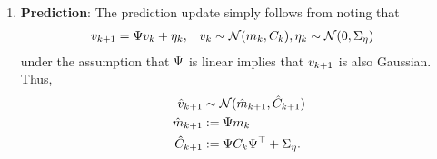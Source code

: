 \documentclass[12pt]{article}
\begin{document}
\begin{enumerate}
\item \textbf{Prediction}: The prediction update simply follows from noting that 
\begin{align*}
\dstate[\timeStep+1] &= \fwdOne \dstate + \indexTimeStep{\noiseDynamic}, 
&&\dstate \sim \Gaussian(\stateMean, \stateCov), \indexTimeStep{\noiseDynamic} \sim \Gaussian(0, \CovNoiseDynamic)
\end{align*}
under the assumption that $\fwdOne$ is linear implies that $\dstate[\timeStep+1]$ is also Gaussian. Thus, 
\begin{align*}
\dstatePred[\timeStep+1] &\sim \Gaussian(\stateMeanPred[\timeStep+1], \stateCovPred[\timeStep+1]) \\
\stateMeanPred[\timeStep+1] &:= \fwdOne \stateMean \\
\stateCovPred[\timeStep+1]  &:= \fwdOne \stateCov \fwdOne^\top + \CovNoiseDynamic.
\end{align*}


\end{enumerate}
\end{document}
